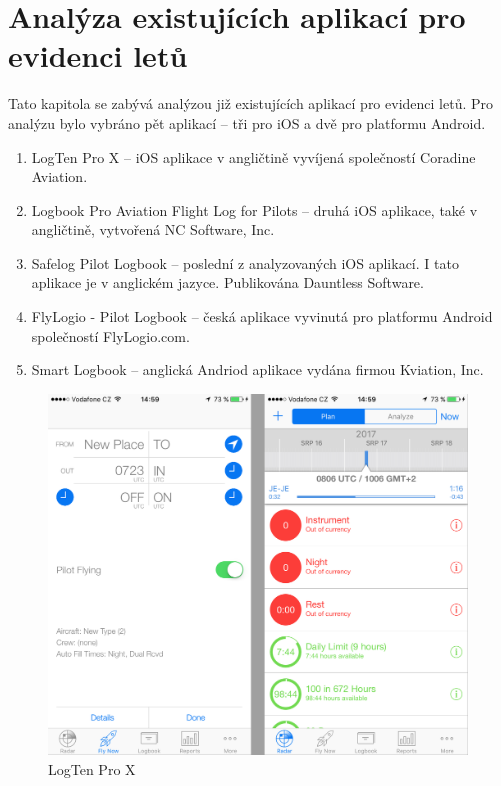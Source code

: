 \documentclass[thesis=M,czech]{FITthesis}[2012/06/26]
\begin{document}
\section{Analýza existujících aplikací pro evidenci letů}
Tato kapitola se zabývá analýzou již existujících aplikací pro evidenci letů. Pro analýzu bylo vybráno pět aplikací -- tři pro iOS a dvě pro platformu Android.
\begin{enumerate}
\item LogTen Pro X -- iOS aplikace v angličtině vyvíjená společností Coradine Aviation. \cite{appStoreLogTen}
\item Logbook Pro Aviation Flight Log for Pilots -- druhá iOS aplikace, také v angličtině, vytvořená NC Software, Inc. \cite{appStoreLogbookPro}
\item Safelog Pilot Logbook -- poslední z analyzovaných iOS aplikací. I tato aplikace je v anglickém jazyce. Publikována Dauntless Software. \cite{appStoreSafeLog}
\item FlyLogio - Pilot Logbook -- česká aplikace vyvinutá pro platformu Android společností FlyLogio.com. \cite{googleFlyLogio}
\item Smart Logbook -- anglická Andriod aplikace vydána firmou Kviation, Inc. \cite{googleSmartLogbook}
\end{enumerate}

\begin{figure}[]\centering
 \includegraphics[width=0.99\textwidth]{./pictures/existujiciAplikace/LogTenProX}
 \caption[LogTen Pro X]{LogTen Pro X}\label{fig:LogTenProX}
\end{figure}
\end{document}

